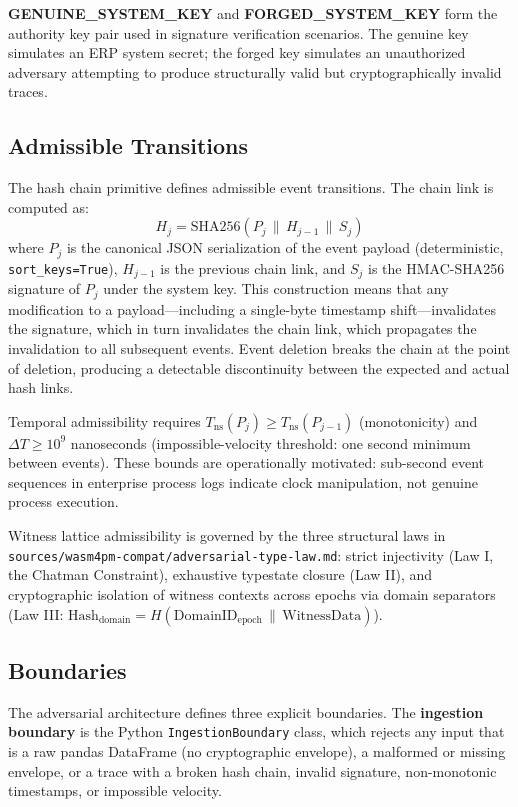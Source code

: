 \textbf{GENUINE\_SYSTEM\_KEY} and \textbf{FORGED\_SYSTEM\_KEY} form the authority key pair
used in signature verification scenarios. The genuine key simulates an ERP system secret;
the forged key simulates an unauthorized adversary attempting to produce structurally valid
but cryptographically invalid traces.

\subsection{Admissible Transitions}
\label{sec:adversarial-architecture-transitions}

The hash chain primitive defines admissible event transitions. The chain link is computed as:
\[
  H_j = \text{SHA256}(P_j \,\|\, H_{j-1} \,\|\, S_j)
\]
where $P_j$ is the canonical JSON serialization of the event payload (deterministic,
\texttt{sort\_keys=True}), $H_{j-1}$ is the previous chain link, and $S_j$ is the
HMAC-SHA256 signature of $P_j$ under the system key. This construction means that any
modification to a payload---including a single-byte timestamp shift---invalidates the
signature, which in turn invalidates the chain link, which propagates the invalidation to all
subsequent events. Event deletion breaks the chain at the point of deletion, producing a
detectable discontinuity between the expected and actual hash links.

Temporal admissibility requires $T_{\text{ns}}(P_j) \geq T_{\text{ns}}(P_{j-1})$ (monotonicity)
and $\Delta T \geq 10^9$ nanoseconds (impossible-velocity threshold: one second minimum
between events). These bounds are operationally motivated: sub-second event sequences in
enterprise process logs indicate clock manipulation, not genuine process execution.

Witness lattice admissibility is governed by the three structural laws in
\texttt{sources/wasm4pm-compat/adversarial-type-law.md}: strict injectivity (Law I, the
Chatman Constraint), exhaustive typestate closure (Law II), and cryptographic isolation of
witness contexts across epochs via domain separators (Law III: $\text{Hash}_{\text{domain}} =
H(\text{DomainID}_{\text{epoch}} \,\|\, \text{WitnessData})$).

\subsection{Boundaries}
\label{sec:adversarial-architecture-boundaries}

The adversarial architecture defines three explicit boundaries. The \textbf{ingestion
boundary} is the Python \texttt{IngestionBoundary} class, which rejects any input that is a
raw pandas DataFrame (no cryptographic envelope), a malformed or missing envelope, or a trace
with a broken hash chain, invalid signature, non-monotonic timestamps, or impossible velocity.

